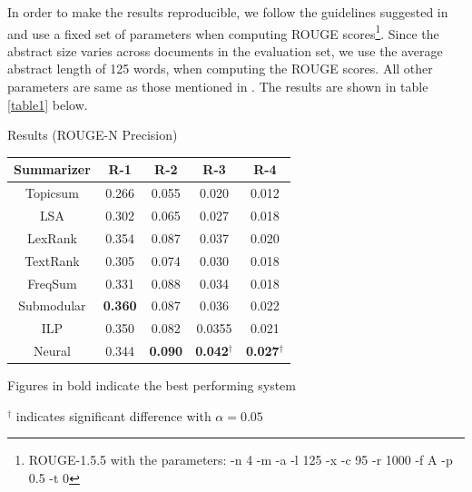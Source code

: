 In order to make the results reproducible, we follow the guidelines suggested in \cite{hong2014repository} and use a fixed set of parameters when computing ROUGE scores\footnote{ROUGE-1.5.5 with the parameters: -n 4 -m -a -l 125 -x -c 95 -r 1000 -f A -p 0.5 -t 0}. Since the abstract size varies across documents in the evaluation set, we use the average abstract length of 125 words, when computing the ROUGE scores. All other parameters are same as those mentioned in \cite{hong2014repository}.  The results are shown in table \ref{table1} below.\\
\vspace{-5mm}
\begin{center}
	\begin{threeparttable}[H]
	\centering
	\caption{Results (ROUGE-N Precision)}
	\begin{tabular}{|c|c|c|c|c|}
		\hline
		Summarizer &      R-1       &      R-2       &           R-3            &           R-4            \\ \hline
		 Topicsum  &     0.266      &     0.055      &          0.020           &          0.012           \\
		   LSA     &     0.302      &     0.065      &          0.027           &          0.018           \\
		 LexRank   &     0.354      &     0.087      &          0.037           &          0.020           \\
		 TextRank  &     0.305      &     0.074      &          0.030           &          0.018           \\
		 FreqSum   &     0.331      &     0.088      &          0.034           &          0.018           \\
		Submodular & \textbf{0.360} &     0.087      &          0.036           &          0.022           \\
		   ILP     &     0.350           &  0.082              &   0.0355                       & 0.021 \\
		  Neural   &     0.344      & \textbf{0.090} & \textbf{0.042}$^\dagger$ & \textbf{0.027}$^\dagger$ \\ \hline
	\end{tabular}
	\begin{tablenotes}
	\small
	\item Figures in bold indicate the best performing system
	\item ${^\dagger}$ indicates significant difference with $\alpha=0.05$\\
	\end{tablenotes}
\label{table1}

\end{threeparttable}
\end{center}

